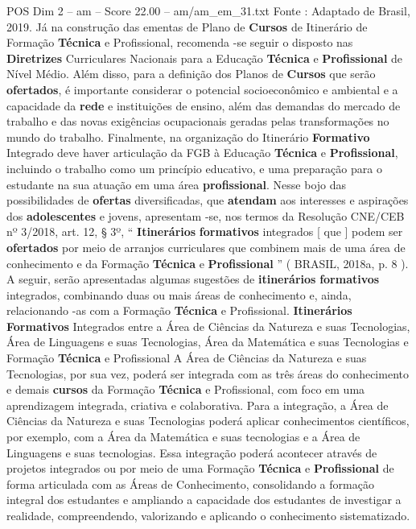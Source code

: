 \begin{textsample}{POS Dim 2 – am – Score 22.00 – am/am\_em\_31.txt}
Fonte : Adaptado de Brasil, 2019.
Já na construção das ementas de Plano de \textbf{Cursos} de Itinerário de Formação \textbf{Técnica} e Profissional, recomenda -se seguir o disposto nas \textbf{Diretrizes} Curriculares Nacionais para a Educação \textbf{Técnica} e \textbf{Profissional} de Nível Médio.
Além disso, para a definição dos Planos de \textbf{Cursos} que serão \textbf{ofertados}, é importante considerar o potencial socioeconômico e ambiental e a capacidade da \textbf{rede} e instituições de ensino, além das demandas do mercado de trabalho e das novas exigências ocupacionais geradas pelas transformações no mundo do trabalho.
Finalmente, na organização do Itinerário \textbf{Formativo} Integrado deve haver articulação da FGB à Educação \textbf{Técnica} e \textbf{Profissional}, incluindo o trabalho como um princípio educativo, e uma preparação para o estudante na sua atuação em uma área \textbf{profissional}.
Nesse bojo das possibilidades de \textbf{ofertas} diversificadas, que \textbf{atendam} aos interesses e aspirações dos \textbf{adolescentes} e jovens, apresentam -se, nos termos da Resolução CNE/CEB nº 3/2018, art. 12, § 3º, “ \textbf{Itinerários} \textbf{formativos} integrados [ que ] podem ser \textbf{ofertados} por meio de arranjos curriculares que combinem mais de uma área de conhecimento e da Formação \textbf{Técnica} e \textbf{Profissional} ” ( BRASIL, 2018a, p. 8 ).
A seguir, serão apresentadas algumas sugestões de \textbf{itinerários} \textbf{formativos} integrados, combinando duas ou mais áreas de conhecimento e, ainda, relacionando -as com a Formação \textbf{Técnica} e Profissional. \textbf{Itinerários} \textbf{Formativos} Integrados entre a Área de Ciências da Natureza e suas Tecnologias, Área de Linguagens e suas Tecnologias, Área da Matemática e suas Tecnologias e Formação \textbf{Técnica} e Profissional A Área de Ciências da Natureza e suas Tecnologias, por sua vez, poderá ser integrada com as três áreas do conhecimento e demais \textbf{cursos} da Formação \textbf{Técnica} e Profissional, com foco em uma aprendizagem integrada, criativa e colaborativa.
Para a integração, a Área de Ciências da Natureza e suas Tecnologias poderá aplicar conhecimentos científicos, por exemplo, com a Área da Matemática e suas tecnologias e a Área de Linguagens e suas tecnologias.
Essa integração poderá acontecer através de projetos integrados ou por meio de uma Formação \textbf{Técnica} e \textbf{Profissional} de forma articulada com as Áreas de Conhecimento, consolidando a formação integral dos estudantes e ampliando a capacidade dos estudantes de investigar a realidade, compreendendo, valorizando e aplicando o conhecimento sistematizado.

\end{textsample}
